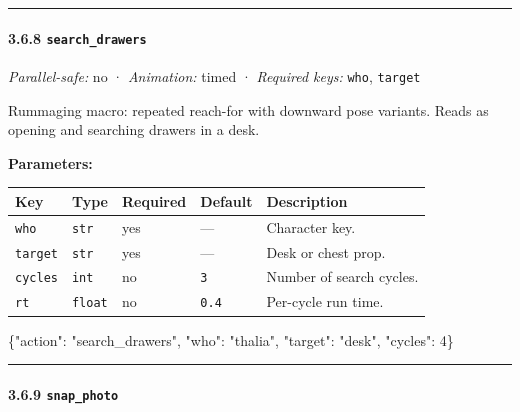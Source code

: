 \documentclass[
  12pt,
  letterpaper,
]{book}
\newenvironment{Shaded}{}{}
\newcommand{\DataTypeTok}[1]{\textcolor[rgb]{0.56,0.13,0.00}{#1}}
\newcommand{\DecValTok}[1]{\textcolor[rgb]{0.25,0.63,0.44}{#1}}
\newcommand{\FunctionTok}[1]{\textcolor[rgb]{0.02,0.16,0.49}{#1}}
\newcommand{\StringTok}[1]{\textcolor[rgb]{0.25,0.44,0.63}{#1}}
\begin{document}
\begin{center}\rule{0.5\linewidth}{0.5pt}\end{center}

\paragraph{\texorpdfstring{3.6.8
\texttt{search\_drawers}}{3.6.8 search\_drawers}}\label{search_drawers}

\emph{Parallel-safe:} no · \emph{Animation:} timed · \emph{Required
keys:} \texttt{who}, \texttt{target}

Rummaging macro: repeated reach-for with downward pose variants. Reads
as opening and searching drawers in a desk.

\textbf{Parameters:}

\begin{longtable}[]{@{}lllll@{}}
\toprule\noalign{}
Key & Type & Required & Default & Description \\
\midrule\noalign{}
\endhead
\bottomrule\noalign{}
\endlastfoot
\texttt{who} & \texttt{str} & yes & --- & Character key. \\
\texttt{target} & \texttt{str} & yes & --- & Desk or chest prop. \\
\texttt{cycles} & \texttt{int} & no & \texttt{3} & Number of search
cycles. \\
\texttt{rt} & \texttt{float} & no & \texttt{0.4} & Per-cycle run
time. \\
\end{longtable}

\begin{Shaded}
\begin{Highlighting}[]
\FunctionTok{\{}\DataTypeTok{"action"}\FunctionTok{:} \StringTok{"search\_drawers"}\FunctionTok{,} \DataTypeTok{"who"}\FunctionTok{:} \StringTok{"thalia"}\FunctionTok{,} \DataTypeTok{"target"}\FunctionTok{:} \StringTok{"desk"}\FunctionTok{,} \DataTypeTok{"cycles"}\FunctionTok{:} \DecValTok{4}\FunctionTok{\}}
\end{Highlighting}
\end{Shaded}

\begin{center}\rule{0.5\linewidth}{0.5pt}\end{center}

\paragraph{\texorpdfstring{3.6.9
\texttt{snap\_photo}}{3.6.9 snap\_photo}}\label{snap_photo}
\end{document}
